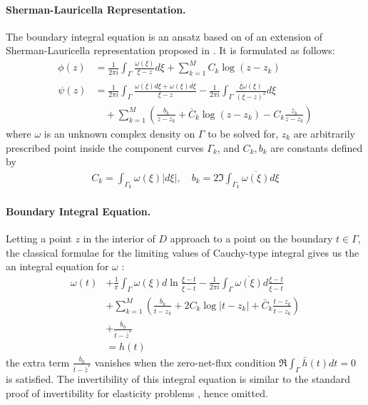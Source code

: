\documentclass[10pt,twocolumn]{article}
\begin{document}
\paragraph*{Sherman-Lauricella Representation.} The boundary integral equation is an ansatz 
based on of an extension of Sherman-Lauricella representation 
proposed in \cite{greengardIntegralEquationMethods1996}. 
It is formulated as follows:
\begin{align}
  \phi(z) &=
    \frac {1}{2\pi i} \int_\Gamma \frac{\omega(\xi)}{\xi - z} d\xi  
    + \sum_{k=1}^M C_k \log (z-z_k)
    \\
  \psi(z) &=
    \frac {1}{2\pi i} \int_\Gamma \frac{\overline{\omega(\xi)}d\xi +  \omega(\xi)\overline{d\xi}}{\xi - z}  
    - \frac {1}{2\pi i} \int_\Gamma \frac{\overline{\xi} \omega(\xi)}{(\xi - z)^2} d\xi  
    \\
    & \quad + \sum _{k=1}^M 
    \left( \frac{b_k}{z-z_k} + \overline C_k \log (z-z_k) -  C_k \frac{\overline z_k}{z-z_k} \right) \nonumber 
\end{align}
where $\omega$ is an unknown complex density on $\Gamma$ to be solved for, 
$z_k$ are arbitrarily prescribed point inside the component curves $\Gamma_k$, 
and $C_k, b_k$ are constants defined by 
\begin{align}
  C_k = \int_{\Gamma_k} \omega(\xi) |d\xi|, \quad b_k = 2 \Im\int_{\Gamma_k} \overline{\omega(\xi)} {d\xi}
\end{align}

\paragraph*{Boundary Integral Equation.} 
Letting a point $z$ in the interior of $D$ approach to a point on the boundary $t\in \Gamma$, 
the classical formulae for the limiting values of Cauchy-type integral 
gives us the an integral equation for $\omega$ \cite{muschelisviliSingularIntegralEquations1972,greengardIntegralEquationMethods1996} :
\begin{align}
  \omega(t) 
  &+ \frac 1{\pi } \int_{\Gamma} \omega(\xi) d\ln \frac{\xi - t}{\overline{\xi - t}} - \frac 1{2\pi i} \int_\Gamma \overline{\omega(\xi)} d \frac{\xi - t}{\overline{\xi - t}} \label{bie} \\
  &+ \sum_{k=1}^M \left( \frac{\bar b_k}{\overline{t- z_k}} +  2C_k \log |t-z_k| + \bar C_k \frac{t-z_k}{\overline{ t - z_k}} \right) \nonumber\\
  &+ \frac{\overline b_0}{\bar t - \bar z^*} \nonumber \\
  &= h(t) \nonumber
\end{align}
the extra term $\frac{\overline b_0}{\bar t - \bar z^*}$ vanishes when the zero-net-flux condition $\Re \int_\Gamma \bar h(t) dt = 0$ is satisfied. 
The invertibility of this integral equation is similar 
to the standard proof of invertibility for elasticity problems \cite{muskhelishviliBasicProblemsMathematical1977}, hence omitted.
\end{document}
